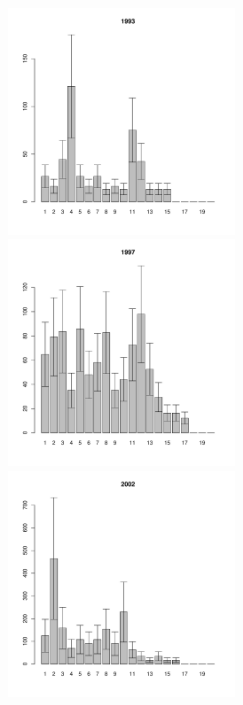 \begin{figure}[h]
\begin{multicols}{3}
\hfill
\includegraphics[width=60mm]{../White_Sea/Luvenga_II_razrez/fucus_zone_1993_.pdf}
\hfill
\includegraphics[width=60mm]{../White_Sea/Luvenga_II_razrez/fucus_zone_1997_.pdf}
\hfill
\includegraphics[width=60mm]{../White_Sea/Luvenga_II_razrez/fucus_zone_2002_.pdf}
\end{multicols}



\end{figure}
